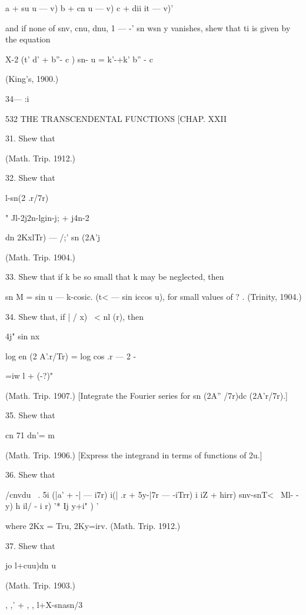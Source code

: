 a + su u — v) b + cn u — v) c + dii it — v)' 

and if none of snv, cnu, dnu, 1 —  -' sn wsn  y vanishes, shew that ti is given by the 
equation 

X-2 (t' d' + b''- c ) sn- u = k'-+k' b'' - c\ 

(King's, 1900.) 

34— :i 



532 THE TRANSCENDENTAL FUNCTIONS [CHAP. XXII 

31. Shew that 

(Math. Trip. 1912.) 

32. Shew that 

l-sn(2 .r/7r) 



"  Jl-2j2n-lgin-j; + j4n-2  



 dn  2KxlTr) — /;' sn (2A'j 

(Math. Trip. 1904.) 

33. Shew that if k be so small that k  may be neglected, then 

sn M = sin u —  k-cosic. (t< — sin iccos u), 
for small values of ? . (Trinity, 1904.) 

34. Shew that, if | /  x) \ <  nl (r), then 

4j" sin  nx 



log en (2 A'.r/Tr) = log cos .r — 2 - 



 =iw l + (-?)"   

(Math. Trip. 1907.) 
[Integrate the Fourier series for sn (2A'' /7r)dc (2A'r/7r).] 

35. Shew that 

cn  71 dn'= m 

(Math. Trip. 1906.) 
[Express the integrand in terms of functions of 2u.] 

36. Shew that 

/cnvdu \ . 5i (|a' + -|  — i7r) i(| .r + 5y-|7r — -iTrr)  i  iZ + hirr) 
snv-snT<~   Ml-  - y)   h il/ - i  r) '* Ij y+i" ) ' 

where 2Kx = Tru, 2Ky=irv. (Math. Trip. 1912.) 

37. Shew that 

  jo  l+cuu)dn u 

(Math. Trip. 1903.) 



, ,' +  , , l+X-snasn/3 

